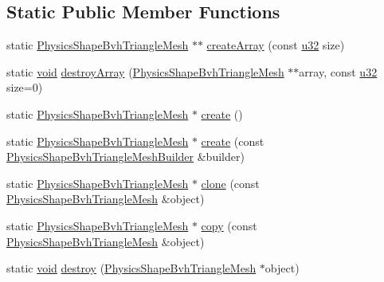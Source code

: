 \subsection*{Static Public Member Functions}
\begin{DoxyCompactItemize}
\item 
static \mbox{\hyperlink{classnjli_1_1_physics_shape_bvh_triangle_mesh}{Physics\+Shape\+Bvh\+Triangle\+Mesh}} $\ast$$\ast$ \mbox{\hyperlink{classnjli_1_1_physics_shape_bvh_triangle_mesh_a308a7517344fdd5a064f19259e01286a}{create\+Array}} (const \mbox{\hyperlink{_util_8h_a10e94b422ef0c20dcdec20d31a1f5049}{u32}} size)
\item 
static \mbox{\hyperlink{_thread_8h_af1e856da2e658414cb2456cb6f7ebc66}{void}} \mbox{\hyperlink{classnjli_1_1_physics_shape_bvh_triangle_mesh_a98bbf411e994ce5db281ad080b33382b}{destroy\+Array}} (\mbox{\hyperlink{classnjli_1_1_physics_shape_bvh_triangle_mesh}{Physics\+Shape\+Bvh\+Triangle\+Mesh}} $\ast$$\ast$array, const \mbox{\hyperlink{_util_8h_a10e94b422ef0c20dcdec20d31a1f5049}{u32}} size=0)
\item 
static \mbox{\hyperlink{classnjli_1_1_physics_shape_bvh_triangle_mesh}{Physics\+Shape\+Bvh\+Triangle\+Mesh}} $\ast$ \mbox{\hyperlink{classnjli_1_1_physics_shape_bvh_triangle_mesh_ae47d76be18e0603117b366f64c73773a}{create}} ()
\item 
static \mbox{\hyperlink{classnjli_1_1_physics_shape_bvh_triangle_mesh}{Physics\+Shape\+Bvh\+Triangle\+Mesh}} $\ast$ \mbox{\hyperlink{classnjli_1_1_physics_shape_bvh_triangle_mesh_a74b16f1f34663f05bfa4b0150c12b382}{create}} (const \mbox{\hyperlink{classnjli_1_1_physics_shape_bvh_triangle_mesh_builder}{Physics\+Shape\+Bvh\+Triangle\+Mesh\+Builder}} \&builder)
\item 
static \mbox{\hyperlink{classnjli_1_1_physics_shape_bvh_triangle_mesh}{Physics\+Shape\+Bvh\+Triangle\+Mesh}} $\ast$ \mbox{\hyperlink{classnjli_1_1_physics_shape_bvh_triangle_mesh_a6d84eee4990aa600cca8a278e55610b2}{clone}} (const \mbox{\hyperlink{classnjli_1_1_physics_shape_bvh_triangle_mesh}{Physics\+Shape\+Bvh\+Triangle\+Mesh}} \&object)
\item 
static \mbox{\hyperlink{classnjli_1_1_physics_shape_bvh_triangle_mesh}{Physics\+Shape\+Bvh\+Triangle\+Mesh}} $\ast$ \mbox{\hyperlink{classnjli_1_1_physics_shape_bvh_triangle_mesh_aea4dfccb4d3f2e77de449eb2ffa18390}{copy}} (const \mbox{\hyperlink{classnjli_1_1_physics_shape_bvh_triangle_mesh}{Physics\+Shape\+Bvh\+Triangle\+Mesh}} \&object)
\item 
static \mbox{\hyperlink{_thread_8h_af1e856da2e658414cb2456cb6f7ebc66}{void}} \mbox{\hyperlink{classnjli_1_1_physics_shape_bvh_triangle_mesh_a7a04fd696544a8e1cdee9d307a1bce67}{destroy}} (\mbox{\hyperlink{classnjli_1_1_physics_shape_bvh_triangle_mesh}{Physics\+Shape\+Bvh\+Triangle\+Mesh}} $\ast$object)

\end{DoxyCompactItemize}
